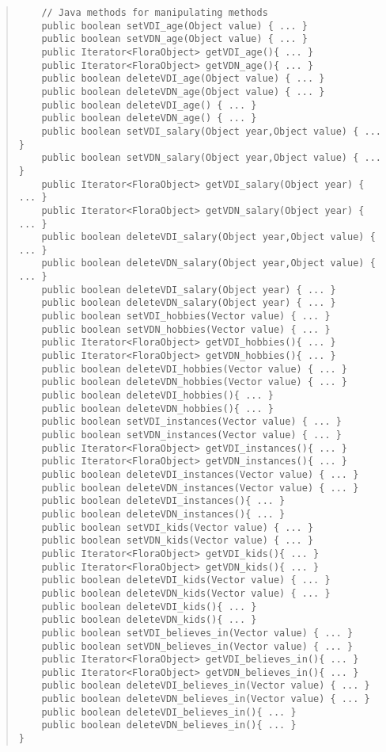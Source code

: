 \begin{quote}
\begin{verbatim}
    // Java methods for manipulating methods
    public boolean setVDI_age(Object value) { ... }
    public boolean setVDN_age(Object value) { ... }
    public Iterator<FloraObject> getVDI_age(){ ... }
    public Iterator<FloraObject> getVDN_age(){ ... }
    public boolean deleteVDI_age(Object value) { ... }
    public boolean deleteVDN_age(Object value) { ... }
    public boolean deleteVDI_age() { ... }
    public boolean deleteVDN_age() { ... }
    public boolean setVDI_salary(Object year,Object value) { ... }
    public boolean setVDN_salary(Object year,Object value) { ... }
    public Iterator<FloraObject> getVDI_salary(Object year) { ... }
    public Iterator<FloraObject> getVDN_salary(Object year) { ... }
    public boolean deleteVDI_salary(Object year,Object value) { ... }
    public boolean deleteVDN_salary(Object year,Object value) { ... }
    public boolean deleteVDI_salary(Object year) { ... }
    public boolean deleteVDN_salary(Object year) { ... }
    public boolean setVDI_hobbies(Vector value) { ... }
    public boolean setVDN_hobbies(Vector value) { ... }
    public Iterator<FloraObject> getVDI_hobbies(){ ... }
    public Iterator<FloraObject> getVDN_hobbies(){ ... }
    public boolean deleteVDI_hobbies(Vector value) { ... }
    public boolean deleteVDN_hobbies(Vector value) { ... }
    public boolean deleteVDI_hobbies(){ ... }
    public boolean deleteVDN_hobbies(){ ... }
    public boolean setVDI_instances(Vector value) { ... }
    public boolean setVDN_instances(Vector value) { ... }
    public Iterator<FloraObject> getVDI_instances(){ ... }
    public Iterator<FloraObject> getVDN_instances(){ ... }
    public boolean deleteVDI_instances(Vector value) { ... }
    public boolean deleteVDN_instances(Vector value) { ... }
    public boolean deleteVDI_instances(){ ... }
    public boolean deleteVDN_instances(){ ... }
    public boolean setVDI_kids(Vector value) { ... }
    public boolean setVDN_kids(Vector value) { ... }
    public Iterator<FloraObject> getVDI_kids(){ ... }
    public Iterator<FloraObject> getVDN_kids(){ ... }
    public boolean deleteVDI_kids(Vector value) { ... }
    public boolean deleteVDN_kids(Vector value) { ... }
    public boolean deleteVDI_kids(){ ... }
    public boolean deleteVDN_kids(){ ... }
    public boolean setVDI_believes_in(Vector value) { ... }
    public boolean setVDN_believes_in(Vector value) { ... }
    public Iterator<FloraObject> getVDI_believes_in(){ ... }
    public Iterator<FloraObject> getVDN_believes_in(){ ... }
    public boolean deleteVDI_believes_in(Vector value) { ... }
    public boolean deleteVDN_believes_in(Vector value) { ... }
    public boolean deleteVDI_believes_in(){ ... }
    public boolean deleteVDN_believes_in(){ ... }
}
\end{verbatim}
\end{quote}

